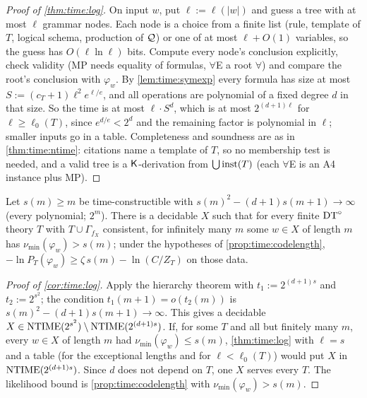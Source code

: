 \begin{proof}[Proof of \cref{thm:time:log}]
On input $w$, put $\ell:=\ell(|w|)$ and guess a tree with at most $\ell$ grammar nodes. Each node is a choice from a finite list (rule, template of $T$, logical schema, production of $\mathcal{Q}$) or one of at most $\ell+O(1)$ variables, so the guess has $O(\ell\ln\ell)$ bits. Compute every node's conclusion explicitly, check validity (MP needs equality of formulas, $\forall$E a root $\forall$) and compare the root's conclusion with $\varphi_w$. By \cref{lem:time:symexp} every formula has size at most $S:=(c_T+1)\ell^2e^{\ell/e}$, and all operations are polynomial of a fixed degree $d$ in that size. So the time is at most $\ell\cdot S^d$, which is at most $2^{(d+1)\ell}$ for $\ell\ge\ell_0(T)$, since $e^{d/e}<2^d$ and the remaining factor is polynomial in $\ell$; smaller inputs go in a table. Completeness and soundness are as in \cref{thm:time:ntime}: citations name a template of $T$, so no membership test is needed, and a valid tree is a $\mathsf{K}$-derivation from $\bigcup\mathrm{inst}(T)$ (each $\forall$E is an A4 instance plus MP).
\end{proof}

\begin{corollary}\label{cor:time:log}
Let $s(m)\ge m$ be time-constructible with $s(m)^2-(d+1)s(m+1)\to\infty$ (every polynomial; $2^m$). There is a decidable $X$ such that for every finite $\mathrm{DT}^{\circ}$ theory $T$ with $T\cup\Gamma_{f_X}$ consistent, for infinitely many $m$ some $w\in X$ of length $m$ has $\nu_{\min}(\varphi_w)>s(m)$; under the hypotheses of \cref{prop:time:codelength}, $-\ln P_T(\varphi_w)\ge\zeta\,s(m)-\ln(C/Z_T)$ on those data.
\end{corollary}

\begin{proof}[Proof of \cref{cor:time:log}]
Apply the hierarchy theorem with $t_1:=2^{(d+1)s}$ and $t_2:=2^{s^2}$; the condition $t_1(m+1)=o(t_2(m))$ is $s(m)^2-(d+1)s(m+1)\to\infty$. This gives a decidable $X\in\mathrm{NTIME}(2^{s^2})\setminus\mathrm{NTIME}(2^{(d+1)s})$. If, for some $T$ and all but finitely many $m$, every $w\in X$ of length $m$ had $\nu_{\min}(\varphi_w)\le s(m)$, \cref{thm:time:log} with $\ell=s$ and a table (for the exceptional lengths and for $\ell<\ell_0(T)$) would put $X$ in $\mathrm{NTIME}(2^{(d+1)s})$. Since $d$ does not depend on $T$, one $X$ serves every $T$. The likelihood bound is \cref{prop:time:codelength} with $\nu_{\min}(\varphi_w)>s(m)$.
\end{proof}

